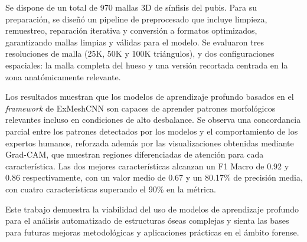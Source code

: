 Se dispone de un total de 970 mallas 3D de sínfisis del pubis. Para su preparación, se diseñó un pipeline de preprocesado que incluye limpieza, remuestreo, reparación iterativa y conversión a formatos optimizados, garantizando mallas limpias y válidas para el modelo. Se evaluaron tres resoluciones de malla (25K, 50K y 100K triángulos), y dos configuraciones espaciales: la malla completa del hueso y una versión recortada centrada en la zona anatómicamente relevante.

Los resultados muestran que los modelos de aprendizaje profundo basados en el \textit{framework} de ExMeshCNN son capaces de aprender patrones morfológicos relevantes incluso en condiciones de alto desbalance. Se observa una concordancia parcial entre los patrones detectados por los modelos y el comportamiento de los expertos humanos, reforzada además por las visualizaciones obtenidas mediante Grad-CAM, que muestran regiones diferenciadas de atención para cada característica. Las dos mejores características alcanzan un F1 Macro de 0.92 y 0.86 respectivamente, con un valor medio de 0.67 y un 80.17\% de precisión media, con cuatro características superando el 90\% en la métrica.

Este trabajo demuestra la viabilidad del uso de modelos de aprendizaje profundo para el análisis automatizado de estructuras óseas complejas y sienta las bases para futuras mejoras metodológicas y aplicaciones prácticas en el ámbito forense.


\newpage
\thispagestyle{empty}


\begin{center}
{\large\bfseries \myTitleENG} \\
\end{center}
\begin{center}
\myName \\
\end{center}

\vspace{0.7cm}
 \\

